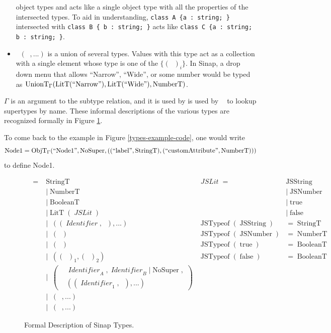 \documentclass[12pt]{article}
\DeclareMathOperator{\StringT}{StringT}
\DeclareMathOperator{\NumberT}{NumberT}
\DeclareMathOperator{\BooleanT}{BooleanT}
\DeclareMathOperator{\LitT}{LitT}
\DeclareMathOperator{\JSLit}{\textit{JSLit}}
\DeclareMathOperator{\JSTypeof}{JSTypeof}
\DeclareMathOperator{\RecT}{RecT_\Gamma}
\DeclareMathOperator{\ObjT}{ObjT_\Gamma}
\DeclareMathOperator{\ListT}{ListT_\Gamma}
\DeclareMathOperator{\SetT}{SetT_\Gamma}
\DeclareMathOperator{\MapT}{MapT_\Gamma}
\DeclareMathOperator{\UnionT}{UnionT_\Gamma}
\DeclareMathOperator{\InterT}{InterT_\Gamma}
\DeclareMathOperator{\Identifier}{\textit{Identifier}}
\DeclareMathOperator{\Type}{{\textit{Type}_\Gamma}}
\DeclareMathOperator{\NoSuper}{NoSuper}
\DeclareMathOperator{\ObjectSubtype}{ObjectSubtype_\Gamma}
\begin{document}
\begin{itemize}
    object types and acts like a single object type with all the 
    properties of the intersected types. 
    To aid in understanding, \verb|class A {a : string; }| intersected
    with \verb|class B { b : string; }| acts like 
    \verb|class C {a : string; b : string; }|. 
    \item \(\UnionT(\Type, ...)\) is a union of several types. 
    Values with this type act as a collection with a single element
    whose type is one of the \(\{(\Type)_i\}\). In Sinap, a drop down 
    menu that allows ``Narrow'', ``Wide'', or some number would be 
    typed as \(\UnionT(\LitT(``\text{Narrow}"), \LitT(``\text{Wide}"),
     \NumberT)\).
\end{itemize}

\(\Gamma\) is an 
argument to the subtype relation, and it is used by is used by \(\ObjectSubtype\) to 
lookup supertypes by name. These informal 
descriptions of the various types are recognized formally 
in Figure \ref{sinap-types-model}.

To come back to the example in Figure \ref{types-example-code}, 
one would write 
\[
    \operatorname{Node1} = \ObjT(``\text{Node1}", \NoSuper, (
        (``\text{label}", \StringT),
        (``\text{customAttribute}", \NumberT)
        ))
\]
to define Node1.

\linespread{1}
\begin{figure}
\begin{mdframed}
\begin{align*}
\Type = &\StringT   &\JSLit = &\operatorname{JSString} \\
&|\NumberT                 &&| \operatorname{JSNumber} \\
&|\BooleanT                &&| \operatorname{true} \\
&|\LitT(\JSLit)            &&| \operatorname{false} \\
&|\RecT((\Identifier, \Type), ...) & \JSTypeof(\operatorname{JSString}) &= \StringT \\
&|\ListT(\Type) & \JSTypeof(\operatorname{JSNumber}) &= \NumberT \\
&|\SetT(\Type) & \JSTypeof(\operatorname{true}) &= \BooleanT \\
&|\MapT((\Type)_1, (\Type)_2) & \JSTypeof(\operatorname{false}) &= \BooleanT \\
&|\ObjT\left(\begin{aligned}
    &\Identifier_A, \Identifier_B | \NoSuper, \\
&((\Identifier_1, \Type), ...)
\end{aligned}\right) \\
&|\InterT(\ObjT, ...) \\
&|\UnionT(\Type, ...)
\end{align*}
\end{mdframed}
\caption{Formal Description of Sinap Types.}
\label{sinap-types-model}
\end{figure}
\end{document}
